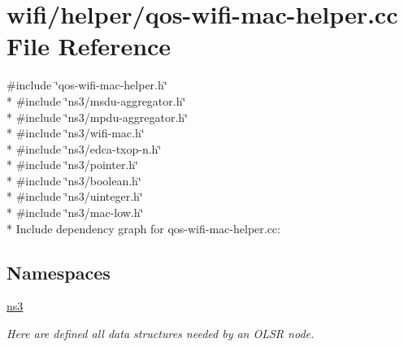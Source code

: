 \hypertarget{qos-wifi-mac-helper_8cc}{}\section{wifi/helper/qos-\/wifi-\/mac-\/helper.cc File Reference}
\label{qos-wifi-mac-helper_8cc}
{\ttfamily \#include \char`\"{}qos-\/wifi-\/mac-\/helper.\+h\char`\"{}}\\*
{\ttfamily \#include \char`\"{}ns3/msdu-\/aggregator.\+h\char`\"{}}\\*
{\ttfamily \#include \char`\"{}ns3/mpdu-\/aggregator.\+h\char`\"{}}\\*
{\ttfamily \#include \char`\"{}ns3/wifi-\/mac.\+h\char`\"{}}\\*
{\ttfamily \#include \char`\"{}ns3/edca-\/txop-\/n.\+h\char`\"{}}\\*
{\ttfamily \#include \char`\"{}ns3/pointer.\+h\char`\"{}}\\*
{\ttfamily \#include \char`\"{}ns3/boolean.\+h\char`\"{}}\\*
{\ttfamily \#include \char`\"{}ns3/uinteger.\+h\char`\"{}}\\*
{\ttfamily \#include \char`\"{}ns3/mac-\/low.\+h\char`\"{}}\\*
Include dependency graph for qos-\/wifi-\/mac-\/helper.cc\+:
\subsection*{Namespaces}
\begin{DoxyCompactItemize}
\item 
 \hyperlink{namespacens3}{ns3}
\begin{DoxyCompactList}\small\item\em Here are defined all data structures needed by an O\+L\+SR node. \end{DoxyCompactList}\end{DoxyCompactItemize}
